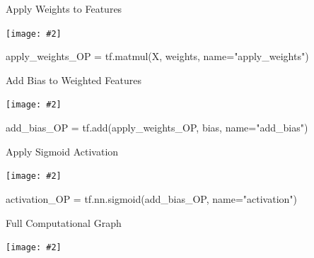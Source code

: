 \documentclass[14pt]{beamer}
\newcommand {\framedgraphic}[2] { %
    \begin{frame}{#1}
        \begin{center}
            \texttt{[image: \#2]}
        \end{center}
    \end{frame}
}
\begin{document}
\framedgraphic{Apply Weights to Features}{2-apply-weights.png}

\begin{frame}[fragile]
  \begin{python}
apply_weights_OP = tf.matmul(X, weights, name="apply_weights")
  \end{python}
\end{frame}


\framedgraphic{Add Bias to Weighted Features}{3-add-bias.png}

\begin{frame}[fragile]
  \begin{python}
add_bias_OP = tf.add(apply_weights_OP, bias, name="add_bias") 
  \end{python}
\end{frame}


\framedgraphic{Apply Sigmoid Activation}{4-apply-sigmoid.png}

\begin{frame}[fragile]
  \begin{python}
activation_OP = tf.nn.sigmoid(add_bias_OP, name="activation")
  \end{python}
\end{frame}


\framedgraphic{Full Computational Graph}{full-graph.png}



\end{document}
